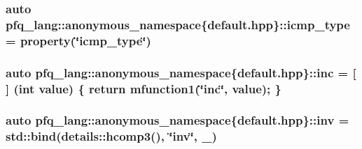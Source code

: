 \hypertarget{namespacepfq__lang_1_1anonymous__namespace_02default_8hpp_03_a4adff7ced08caa2d0016a911dae6d2ed}{
\subsubsection[{icmp\+\_\+type}]{\setlength{\rightskip}{0pt plus 5cm}auto pfq\+\_\+lang\+::anonymous\+\_\+namespace\{default.\+hpp\}\+::icmp\+\_\+type = {\bf property}(\char`\"{}icmp\+\_\+type\char`\"{})}}\label{namespacepfq__lang_1_1anonymous__namespace_02default_8hpp_03_a4adff7ced08caa2d0016a911dae6d2ed}
\hypertarget{namespacepfq__lang_1_1anonymous__namespace_02default_8hpp_03_a14246183085ec07f08ab9b0d53907ae5}{
\subsubsection[{inc}]{\setlength{\rightskip}{0pt plus 5cm}auto pfq\+\_\+lang\+::anonymous\+\_\+namespace\{default.\+hpp\}\+::inc = \mbox{[}$\,$\mbox{]} (int value) \{ return {\bf mfunction1}(\char`\"{}inc\char`\"{}, value); \}}}\label{namespacepfq__lang_1_1anonymous__namespace_02default_8hpp_03_a14246183085ec07f08ab9b0d53907ae5}
\hypertarget{namespacepfq__lang_1_1anonymous__namespace_02default_8hpp_03_a1a7f650c8e5cb5742c80b68f6144bec1}{
\subsubsection[{inv}]{\setlength{\rightskip}{0pt plus 5cm}auto pfq\+\_\+lang\+::anonymous\+\_\+namespace\{default.\+hpp\}\+::inv = std\+::bind(details\+::hcomp3(), \char`\"{}inv\char`\"{}, \+\_)}}\label{namespacepfq__lang_1_1anonymous__namespace_02default_8hpp_03_a1a7f650c8e5cb5742c80b68f6144bec1}
